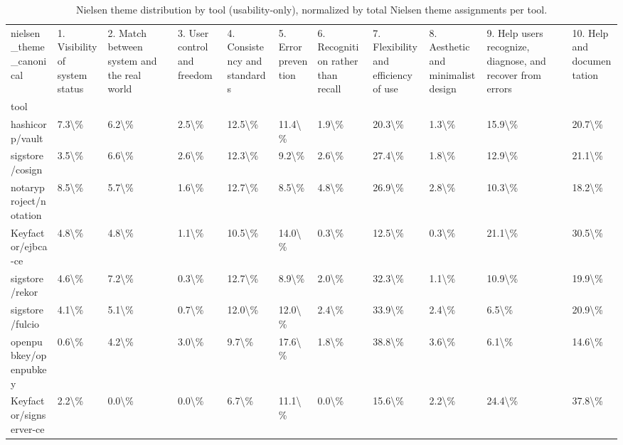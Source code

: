 \begin{table}[t]
\centering
\caption{Nielsen theme distribution by tool (usability-only), normalized by total Nielsen theme assignments per tool.}
\label{tab:nielsen-theme-percent-by-tool}
\scriptsize
\begin{tabular}{lllllllllll}
\toprule
nielsen_theme_canonical & 1. Visibility of system status & 2. Match between system and the real world & 3. User control and freedom & 4. Consistency and standards & 5. Error prevention & 6. Recognition rather than recall & 7. Flexibility and efficiency of use & 8. Aesthetic and minimalist design & 9. Help users recognize, diagnose, and recover from errors & 10. Help and documentation \\
tool &  &  &  &  &  &  &  &  &  &  \\
\midrule
hashicorp/vault & 7.3\textbackslash \% & 6.2\textbackslash \% & 2.5\textbackslash \% & 12.5\textbackslash \% & 11.4\textbackslash \% & 1.9\textbackslash \% & 20.3\textbackslash \% & 1.3\textbackslash \% & 15.9\textbackslash \% & 20.7\textbackslash \% \\
sigstore/cosign & 3.5\textbackslash \% & 6.6\textbackslash \% & 2.6\textbackslash \% & 12.3\textbackslash \% & 9.2\textbackslash \% & 2.6\textbackslash \% & 27.4\textbackslash \% & 1.8\textbackslash \% & 12.9\textbackslash \% & 21.1\textbackslash \% \\
notaryproject/notation & 8.5\textbackslash \% & 5.7\textbackslash \% & 1.6\textbackslash \% & 12.7\textbackslash \% & 8.5\textbackslash \% & 4.8\textbackslash \% & 26.9\textbackslash \% & 2.8\textbackslash \% & 10.3\textbackslash \% & 18.2\textbackslash \% \\
Keyfactor/ejbca-ce & 4.8\textbackslash \% & 4.8\textbackslash \% & 1.1\textbackslash \% & 10.5\textbackslash \% & 14.0\textbackslash \% & 0.3\textbackslash \% & 12.5\textbackslash \% & 0.3\textbackslash \% & 21.1\textbackslash \% & 30.5\textbackslash \% \\
sigstore/rekor & 4.6\textbackslash \% & 7.2\textbackslash \% & 0.3\textbackslash \% & 12.7\textbackslash \% & 8.9\textbackslash \% & 2.0\textbackslash \% & 32.3\textbackslash \% & 1.1\textbackslash \% & 10.9\textbackslash \% & 19.9\textbackslash \% \\
sigstore/fulcio & 4.1\textbackslash \% & 5.1\textbackslash \% & 0.7\textbackslash \% & 12.0\textbackslash \% & 12.0\textbackslash \% & 2.4\textbackslash \% & 33.9\textbackslash \% & 2.4\textbackslash \% & 6.5\textbackslash \% & 20.9\textbackslash \% \\
openpubkey/openpubkey & 0.6\textbackslash \% & 4.2\textbackslash \% & 3.0\textbackslash \% & 9.7\textbackslash \% & 17.6\textbackslash \% & 1.8\textbackslash \% & 38.8\textbackslash \% & 3.6\textbackslash \% & 6.1\textbackslash \% & 14.6\textbackslash \% \\
Keyfactor/signserver-ce & 2.2\textbackslash \% & 0.0\textbackslash \% & 0.0\textbackslash \% & 6.7\textbackslash \% & 11.1\textbackslash \% & 0.0\textbackslash \% & 15.6\textbackslash \% & 2.2\textbackslash \% & 24.4\textbackslash \% & 37.8\textbackslash \% \\
\bottomrule
\end{tabular}

\end{table}
